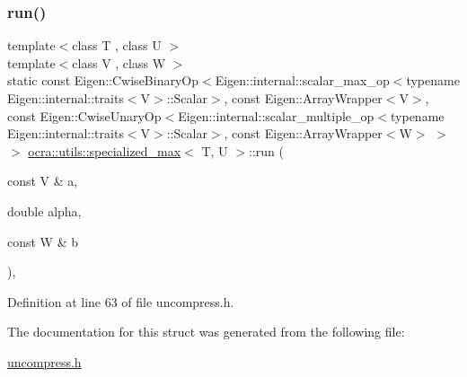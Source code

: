 \subsubsection{\texorpdfstring{run()}{run()}\hspace{0.1cm}{\footnotesize\ttfamily [2/2]}}
{\footnotesize\ttfamily template$<$class T , class U $>$ \\
template$<$class V , class W $>$ \\
static const Eigen\+::\+Cwise\+Binary\+Op$<$Eigen\+::internal\+::scalar\+\_\+max\+\_\+op$<$typename Eigen\+::internal\+::traits$<$V$>$\+::Scalar$>$, const Eigen\+::\+Array\+Wrapper$<$V$>$, const Eigen\+::\+Cwise\+Unary\+Op$<$Eigen\+::internal\+::scalar\+\_\+multiple\+\_\+op$<$typename Eigen\+::internal\+::traits$<$V$>$\+::Scalar$>$, const Eigen\+::\+Array\+Wrapper$<$W$>$ $>$ $>$ \hyperlink{structocra_1_1utils_1_1specialized__max}{ocra\+::utils\+::specialized\+\_\+max}$<$ T, U $>$\+::run (\begin{DoxyParamCaption}\item[{const V \&}]{a,  }\item[{double}]{alpha,  }\item[{const W \&}]{b }\end{DoxyParamCaption})\hspace{0.3cm}{\ttfamily [inline]}, {\ttfamily [static]}}



Definition at line 63 of file uncompress.\+h.



The documentation for this struct was generated from the following file\+:\begin{DoxyCompactItemize}
\item 
\hyperlink{uncompress_8h}{uncompress.\+h}\end{DoxyCompactItemize}
